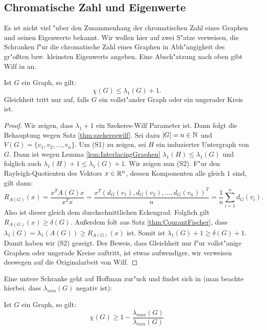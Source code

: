 \subsection{Chromatische Zahl und Eigenwerte}
Es ist nicht viel "uber den Zusammenhang der chromatischen Zahl eines Graphen und seinen Eigenwerte bekannt. Wir wollen hier auf zwei S"atze verweisen, die Schranken f"ur die chromatische Zahl eines Graphen in Abh"angigkeit des gr"o{\ss}ten bzw. kleinsten Eigenwerts angeben. Eine Absch"atzung nach oben  gibt Wilf in \cite{Wilf67} an.

\begin{theorem}
  Ist $G$ ein Graph, so gilt: 
  $$\chi(G) \leq \lambda_{1}(G) +1.$$
  Gleichheit tritt nur auf, falls $G$ ein vollst"ander Graph oder ein ungerader Kreis ist.
  \label{thm:wilfev}
\end{theorem}

\begin{proof}
  Wir zeigen, dass $\lambda_{1}+1$ ein Szekeres-Wilf Parameter ist. Dann folgt die Behauptung wegen Satz \ref{thm:szekereswilf}. Sei dazu $|G| = n \in {\mathbb{N}}$ und $V(G)= \{v_1,v_2, \dots , v_n \}$. 
  Um (S1) zu zeigen, sei $H$ ein induzierter Untergraph von $G$. Dann ist wegen Lemma \ref{lem:InterlacingGraphen} $\lambda_{1}(H) \leq \lambda_{1}(G)$ und folglich auch $\lambda_{1}(H) +1 \leq \lambda_{1}(G) +1$.
  Wir zeigen nun (S2). F"ur den Rayleigh-Quotienten des Vektors $x\in {\mathbb{R}}^{n}$, dessen Komponenten alle gleich $1$ sind, gilt dann:
  $$R_{A(G)}(x) = \frac{x^{T}A(G)x}{x^{T}x} = \frac{x^{T}(d_G(v_1),d_G(v_2),\dots, d_G(v_n))^{T}}{n} = \frac{1}{n} \sum\limits_{i=1}^{n} d_G(v_i).$$ 
  Also ist dieser gleich dem durchschnittlichen Eckengrad. Folglich gilt $R_{A(G)}(x) \geq \delta(G)$. Au{\ss}erdem folt aus Satz \ref{thm:CourantFischer}, dass $\lambda_{1}(G) = \lambda_{1}(A(G)) \geq R_{A(G)}(x)$ ist. Somit ist
  $\lambda_{1}(G) +1 \geq \delta(G) +1$. Damit haben wir (S2) gezeigt. 
  Der Beweis, dass Gleichheit nur f"ur vollst"anige Graphen oder ungerade Kreise auftritt, ist etwas aufwendiger, wir verweisen deswegen auf die Originalarbeit \cite{Wilf67} von Wilf.
\end{proof}

Eine untere Schranke geht auf Hoffman zur"uck und findet sich in \cite{Hoffman70}(man beachte hierbei, dass $\lambda_{min}(G)$ negativ ist):
\begin{theorem}
  Ist $G$ ein Graph, so gilt:
  $$\chi(G) \geq 1 - \frac{\lambda_{max}(G)}{\lambda_{min}(G)}$$
  \label{thm:Hoffmanev}
\end{theorem}

